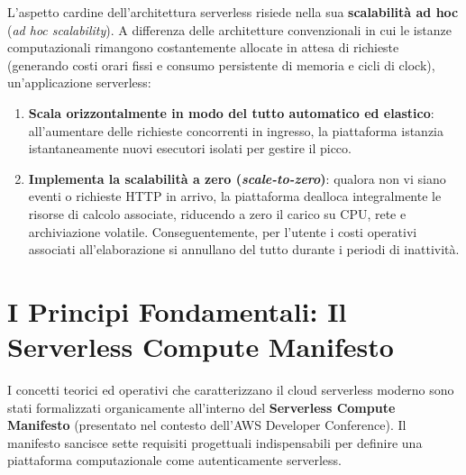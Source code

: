 \documentclass[11pt, a4paper]{article}
\begin{document}
L'aspetto cardine dell'architettura serverless risiede nella sua \textbf{scalabilità ad hoc} (\emph{ad hoc scalability}). A differenza delle architetture convenzionali in cui le istanze computazionali rimangono costantemente allocate in attesa di richieste (generando costi orari fissi e consumo persistente di memoria e cicli di clock), un'applicazione serverless:
\begin{enumerate}[noitemsep]
    \item \textbf{Scala orizzontalmente in modo del tutto automatico ed elastico}: all'aumentare delle richieste concorrenti in ingresso, la piattaforma istanzia istantaneamente nuovi esecutori isolati per gestire il picco.
    \item \textbf{Implementa la scalabilità a zero (\emph{scale-to-zero})}: qualora non vi siano eventi o richieste HTTP in arrivo, la piattaforma dealloca integralmente le risorse di calcolo associate, riducendo a zero il carico su CPU, rete e archiviazione volatile. Conseguentemente, per l'utente i costi operativi associati all'elaborazione si annullano del tutto durante i periodi di inattività.
\end{enumerate}

\newpage


\section{I Principi Fondamentali: Il Serverless Compute Manifesto}

I concetti teorici ed operativi che caratterizzano il cloud serverless moderno sono stati formalizzati organicamente all'interno del \textbf{Serverless Compute Manifesto} (presentato nel contesto dell'AWS Developer Conference). Il manifesto sancisce sette requisiti progettuali indispensabili per definire una piattaforma computazionale come autenticamente serverless.
\end{document}
